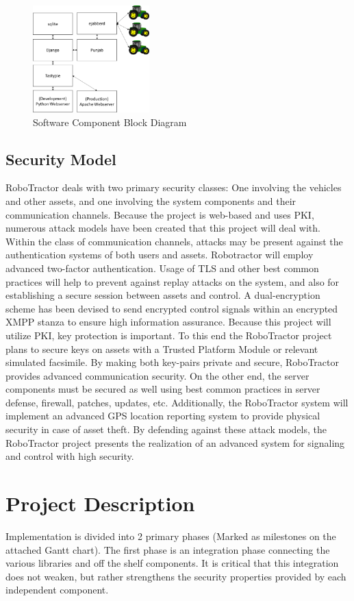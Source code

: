 \documentclass[conference,12pt]{IEEEtran}
\begin{document}
\begin{figure}
\centering
\includegraphics[width=0.4\textwidth]{SoftwareComponentBlockDiagram.pdf}
\caption{Software Component Block Diagram}
\label{fig:softwarecomponents}
\end{figure}

\subsection{Security Model}
RoboTractor deals with two primary security classes: One involving the vehicles
and other assets, and one involving the system components and their communication channels.
Because the project is web-based and uses PKI, numerous attack models have
been created that this project will deal with. Within the class of communication channels,
attacks may be present against the authentication systems of both users and assets. Robotractor will employ
advanced two-factor authentication. Usage of TLS and other best common practices will help to prevent
against replay attacks on the system, and also for establishing a secure session between assets and control.
A dual-encryption scheme has been devised to send encrypted control signals within an encrypted XMPP stanza
to ensure high information assurance. Because this project will utilize PKI, key protection is important. To this end
the RoboTractor project plans to secure keys on assets with a Trusted Platform Module or relevant simulated facsimile.
By making both key-pairs private and secure, RoboTractor provides advanced communication security.
On the other end, the server components must be secured as well using best common practices in server defense, firewall,
patches, updates, etc. Additionally, the RoboTractor system will implement an advanced GPS location reporting system
to provide physical security in case of asset theft. By defending against these attack models, the RoboTractor project
presents the realization of an advanced system for signaling and control with high security. 

\section{Project Description}
Implementation is divided into 2 primary phases (Marked as milestones on the
attached Gantt chart).  The first phase is an integration phase connecting
the various libraries and off the shelf components. It is critical that this
integration does not weaken, but rather strengthens the security properties
provided by each independent component. 
\end{document}
